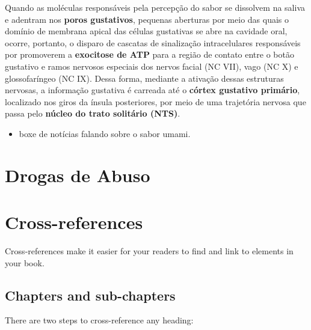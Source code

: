 \documentclass[
]{book}
\providecommand{\tightlist}{%
  \setlength{\itemsep}{0pt}\setlength{\parskip}{0pt}}
\theoremstyle{definition}
\theoremstyle{definition}
\theoremstyle{definition}
\theoremstyle{definition}
\theoremstyle{remark}
\begin{document}
Quando as moléculas responsáveis pela percepção do sabor se dissolvem na saliva e adentram nos \textbf{poros gustativos}, pequenas aberturas por meio das quais o domínio de membrana apical das células gustativas se abre na cavidade oral, ocorre, portanto, o disparo de cascatas de sinalização intracelulares responsáveis por promoverem a \textbf{exocitose de ATP} para a região de contato entre o botão gustativo e ramos nervosos especiais dos nervos facial (NC VII), vago (NC X) e glossofaríngeo (NC IX). Dessa forma, mediante a ativação dessas estruturas nervosas, a informação gustativa é carreada até o \textbf{córtex gustativo primário}, localizado nos giros da ínsula posteriores, por meio de uma trajetória nervosa que passa pelo \textbf{núcleo do trato solitário (NTS)}.

\begin{itemize}
\tightlist
\item
  boxe de notícias falando sobre o sabor umami.
\end{itemize}

\hypertarget{drogas-de-abuso}{%
\chapter{Drogas de Abuso}\label{drogas-de-abuso}}

\hypertarget{cross}{%
\chapter{Cross-references}\label{cross}}

Cross-references make it easier for your readers to find and link to elements in your book.

\hypertarget{chapters-and-sub-chapters}{%
\section{Chapters and sub-chapters}\label{chapters-and-sub-chapters}}

There are two steps to cross-reference any heading:
\end{document}
